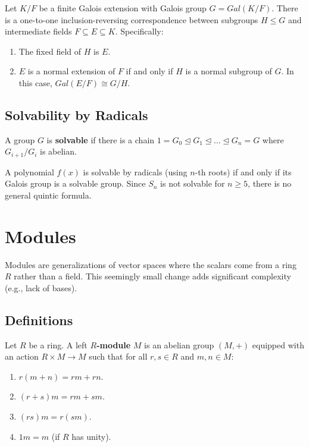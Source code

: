 \begin{theorem}
Let $K/F$ be a finite Galois extension with Galois group $G = Gal(K/F)$. There is a one-to-one inclusion-reversing correspondence between subgroups $H \leq G$ and intermediate fields $F \subseteq E \subseteq K$.
Specifically:
\begin{enumerate}
    \item The fixed field of $H$ is $E$.
    \item $E$ is a normal extension of $F$ if and only if $H$ is a normal subgroup of $G$. In this case, $Gal(E/F) \cong G/H$.
\end{enumerate}
\end{theorem}

\subsection{Solvability by Radicals}

\begin{definition}
A group $G$ is \textbf{solvable} if there is a chain $1 = G_0 \trianglelefteq G_1 \trianglelefteq \dots \trianglelefteq G_n = G$ where $G_{i+1}/G_i$ is abelian.
\end{definition}

\begin{theorem}
A polynomial $f(x)$ is solvable by radicals (using $n$-th roots) if and only if its Galois group is a solvable group. Since $S_n$ is not solvable for $n \geq 5$, there is no general quintic formula.
\end{theorem}

\section{Modules}

Modules are generalizations of vector spaces where the scalars come from a ring $R$ rather than a field. This seemingly small change adds significant complexity (e.g., lack of bases).

\subsection{Definitions}

\begin{definition}[R-Module]
Let $R$ be a ring. A left \textbf{$R$-module} $M$ is an abelian group $(M, +)$ equipped with an action $R \times M \to M$ such that for all $r, s \in R$ and $m, n \in M$:
\begin{enumerate}
    \item $r(m+n) = rm + rn$.
    \item $(r+s)m = rm + sm$.
    \item $(rs)m = r(sm)$.
    \item $1m = m$ (if $R$ has unity).
\end{enumerate}
\end{definition}

